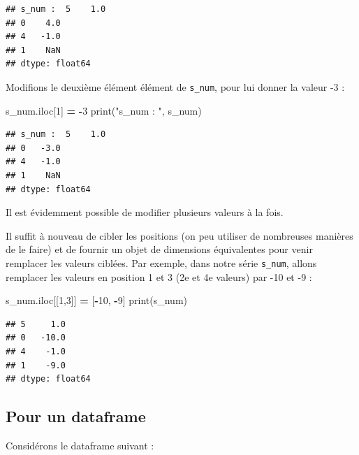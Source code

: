 \documentclass[12pt,]{book}
\newenvironment{Shaded}{\begin{snugshade}}{\end{snugshade}}
\newcommand{\DecValTok}[1]{\textcolor[rgb]{0.00,0.00,0.81}{#1}}
\newcommand{\StringTok}[1]{\textcolor[rgb]{0.31,0.60,0.02}{#1}}
\newcommand{\OperatorTok}[1]{\textcolor[rgb]{0.81,0.36,0.00}{\textbf{#1}}}
\newcommand{\BuiltInTok}[1]{#1}
\newcommand{\NormalTok}[1]{#1}
\numberwithin{equation}{section}
\numberwithin{countremarque}{section}
\begin{document}
\begin{lstlisting}
## s_num :  5    1.0
## 0    4.0
## 4   -1.0
## 1    NaN
## dtype: float64
\end{lstlisting}

Modifions le deuxième élément élément de \texttt{s\_num}, pour lui
donner la valeur -3 :

\begin{Shaded}
\begin{Highlighting}[]
\NormalTok{s_num.iloc[}\DecValTok{1}\NormalTok{] }\OperatorTok{=} \OperatorTok{-}\DecValTok{3}
\BuiltInTok{print}\NormalTok{(}\StringTok{"s_num : "}\NormalTok{, s_num)}
\end{Highlighting}
\end{Shaded}

\begin{lstlisting}
## s_num :  5    1.0
## 0   -3.0
## 4   -1.0
## 1    NaN
## dtype: float64
\end{lstlisting}

Il est évidemment possible de modifier plusieurs valeurs à la fois.

Il suffit à nouveau de cibler les positions (on peu utiliser de
nombreuses manières de le faire) et de fournir un objet de dimensions
équivalentes pour venir remplacer les valeurs ciblées. Par exemple, dans
notre série \texttt{s\_num}, allons remplacer les valeurs en position 1
et 3 (2e et 4e valeurs) par -10 et -9 :

\begin{Shaded}
\begin{Highlighting}[]
\NormalTok{s_num.iloc[[}\DecValTok{1}\NormalTok{,}\DecValTok{3}\NormalTok{]] }\OperatorTok{=}\NormalTok{ [}\OperatorTok{-}\DecValTok{10}\NormalTok{, }\OperatorTok{-}\DecValTok{9}\NormalTok{]}
\BuiltInTok{print}\NormalTok{(s_num)}
\end{Highlighting}
\end{Shaded}

\begin{lstlisting}
## 5     1.0
## 0   -10.0
## 4    -1.0
## 1    -9.0
## dtype: float64
\end{lstlisting}

\subsection{Pour un dataframe}\label{pour-un-dataframe}

Considérons le dataframe suivant :
\end{document}
